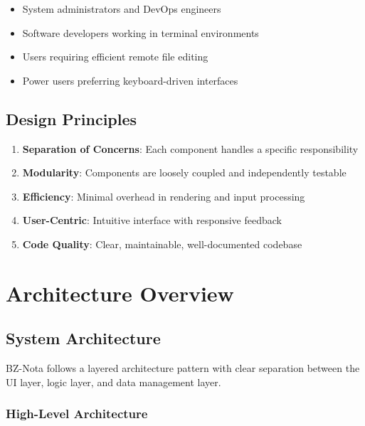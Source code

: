 \documentclass[12pt,a4paper,oneside,openany]{report}
\begin{document}
\begin{itemize}
	\item System administrators and DevOps engineers
	\item Software developers working in terminal environments
	\item Users requiring efficient remote file editing
	\item Power users preferring keyboard-driven interfaces
\end{itemize}

\section{Design Principles}

\begin{enumerate}
	\item \textbf{Separation of Concerns}: Each component handles a specific responsibility
	\item \textbf{Modularity}: Components are loosely coupled and independently testable
	\item \textbf{Efficiency}: Minimal overhead in rendering and input processing
	\item \textbf{User-Centric}: Intuitive interface with responsive feedback
	\item \textbf{Code Quality}: Clear, maintainable, well-documented codebase
\end{enumerate}

\chapter{Architecture Overview}

\section{System Architecture}

BZ-Nota follows a layered architecture pattern with clear separation between the UI layer, logic layer, and data management layer.

\subsection{High-Level Architecture}
\end{document}
